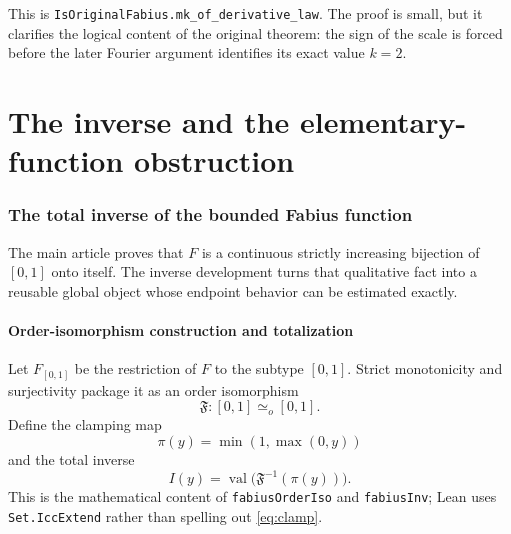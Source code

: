 \documentclass[11pt,oneside]{article}
\theoremstyle{definition}
\theoremstyle{remark}
\newcommand{\lean}[1]{\texttt{#1}}
\begin{document}
This is \lean{IsOriginalFabius.mk\_of\_derivative\_law}.  The proof is small, but it clarifies
the logical content of the original theorem: the sign of the scale is forced before the later
Fourier argument identifies its exact value $k=2$.

\part{The inverse and the elementary-function obstruction}

\section{The total inverse of the bounded Fabius function}
\label{sec:inverse}

The main article proves that $F$ is a continuous strictly increasing bijection of $[0,1]$
onto itself.  The inverse development turns that qualitative fact into a reusable global
object whose endpoint behavior can be estimated exactly.

\subsection{Order-isomorphism construction and totalization}

Let $F_{[0,1]}$ be the restriction of $F$ to the subtype $[0,1]$.  Strict monotonicity and
surjectivity package it as an order isomorphism
\begin{equation}
 \mathfrak F:[0,1]\simeq_o[0,1].
 \label{eq:fabius-order-iso}
\end{equation}
Define the clamping map
\begin{equation}
 \pi(y)=\min(1,\max(0,y))
 \label{eq:clamp}
\end{equation}
and the total inverse
\begin{equation}
 I(y)=\operatorname{val}\bigl(\mathfrak F^{-1}(\pi(y))\bigr).
 \label{eq:total-inverse}
\end{equation}
This is the mathematical content of \lean{fabiusOrderIso} and \lean{fabiusInv}; Lean uses
\lean{Set.IccExtend} rather than spelling out \eqref{eq:clamp}.
\end{document}
